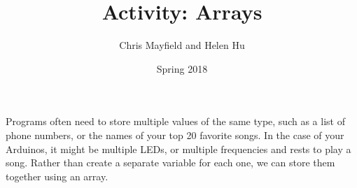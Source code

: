 \documentclass[12pt]{article}
\title{Activity: Arrays}
\author{Chris Mayfield and Helen Hu}
\date{Spring 2018}
\begin{document}
\maketitle

Programs often need to store multiple values of the same type, such as a list of
phone numbers, or the names of your top 20 favorite songs. In the case of your
Arduinos, it might be multiple LEDs, or multiple frequencies and rests to play a
song.  Rather than create a separate variable for each one, we can store them
together using an array.



\end{document}

